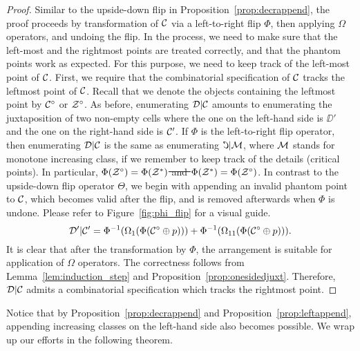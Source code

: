 \documentclass[12pt, a4paper, twoside]{report}
\providecommand{\DIFaddtex}[1]{{\protect\color{blue}\uwave{#1}}} %
\providecommand{\DIFdeltex}[1]{{\protect\color{red}\sout{#1}}}                      %
\providecommand{\DIFaddbegin}{} %
\providecommand{\DIFaddend}{} %
\providecommand{\DIFdelbegin}{} %
\providecommand{\DIFdelend}{} %
\providecommand{\DIFadd}[1]{\texorpdfstring{\DIFaddtex{#1}}{#1}} %
\providecommand{\DIFdel}[1]{\texorpdfstring{\DIFdeltex{#1}}{}} %
\begin{document}
\begin{proof}
Similar to the upside-down flip in Proposition~\ref{prop:decrappend}, the proof proceeds by transformation of $\mathcal{C}$ via a left-to-right flip $\Phi$, then applying $\Omega$ operators, and undoing the flip. In the process, we need to make sure that the left-most and the rightmost points are treated correctly, and that the phantom points work as expected. For this purpose, we need to keep track of the left-most point of $\mathcal{C}$. First, we require that the combinatorial specification of $\mathcal{C}$ tracks the leftmost point of $\mathcal{C}$. Recall that we denote the objects containing the leftmost point by $\mathcal{C}^\circ$ or $\mathcal{Z}^\circ$. As before, enumerating $\mathcal{D}|\mathcal{C}$ amounts to enumerating the juxtaposition of two non-empty cells where the one on the left-hand side is $\DD'$ and the one on the right-hand side is $\mathcal{C}'$. If $\Phi$ is the left-to-right flip operator, then enumerating $\mathcal{D}|\mathcal{C}$ is the same as enumerating $\reflectbox{\C}|\M$, where $\mathcal{M}$ stands for monotone increasing class, if we remember to keep track of the details (critical points). In particular, \DIFdelbegin \DIFdel{$\Phi(\mathcal{Z}^\circ) = \Phi(\mathcal{Z}^*)$ and $\Phi(\mathcal{Z}^*) = \Phi(\mathcal{Z}^\circ)$}\DIFdelend \DIFaddbegin \DIFadd{$\Phi(\Z^\circ) = \Z^*$ and $\Phi(\Z^*) = \Z^\circ$}\DIFaddend . In contrast to the upside-down flip operator $\Theta$, we begin with appending an invalid phantom point to $\mathcal{C}$, which becomes valid after the flip, and is removed afterwards when $\Phi$ is undone. Please refer to Figure~\ref{fig:phi_flip} for a visual guide. 
$$\mathcal{D}'|\mathcal{C}' = \Phi^{-1}(\Omega_1(\Phi(\mathcal{C}^\circ\oplus p))) + \Phi^{-1}(\Omega_{11}(\Phi(\mathcal{C}^\circ\oplus p))).$$
It is clear that after the transformation by $\Phi$, the arrangement is suitable for application of $\Omega$ operators. The correctness follows from Lemma~\ref{lem:induction_step} and Proposition~\ref{prop:onesidedjuxt}. Therefore, $\mathcal{D}|\mathcal{C}$ admits a combinatorial specification which tracks the rightmost point.
\end{proof}
Notice that by Proposition~\ref{prop:decrappend} and Proposition~\ref{prop:leftappend}, appending increasing classes on the left-hand side also becomes possible. We wrap up our efforts in the following theorem.
\end{document}
